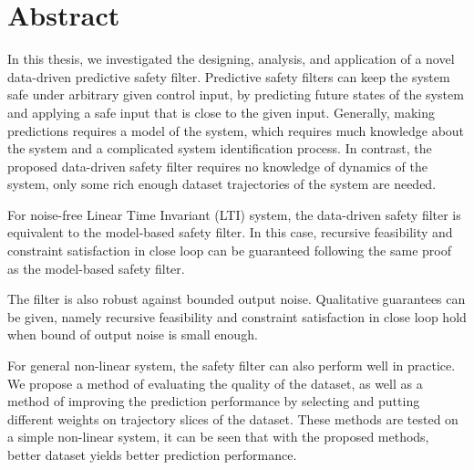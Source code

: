 




 \setcounter{tocdepth}{2}
 \tableofcontents

 \cleardoublepage


\chapter*{Abstract}

In this thesis, we investigated the designing, analysis, and application of a novel data-driven predictive safety filter.
Predictive safety filters can keep the system safe under arbitrary given control input, by predicting future states of the system and applying a safe input that is close to the given input.
Generally, making predictions requires a model of the system, which requires much knowledge about the system and a complicated system identification process.
In contrast, the proposed data-driven safety filter requires no knowledge of dynamics of the system, only some rich enough dataset trajectories of the system are needed.

For noise-free Linear Time Invariant (LTI) system, the data-driven safety filter is equivalent to the model-based safety filter.
In this case, recursive feasibility and constraint satisfaction in close loop can be guaranteed following the same proof as the model-based safety filter.

The filter is also robust against bounded output noise.
Qualitative guarantees can be given, namely recursive feasibility and constraint satisfaction in close loop hold when bound of output noise is small enough.

For general non-linear system, the safety filter can also perform well in practice.
We propose a method of evaluating the quality of the dataset, as well as a method of improving the prediction performance by selecting and putting different weights on trajectory slices of the dataset.
These methods are tested on a simple non-linear system, it can be seen that with the proposed methods, better dataset yields better prediction performance.

